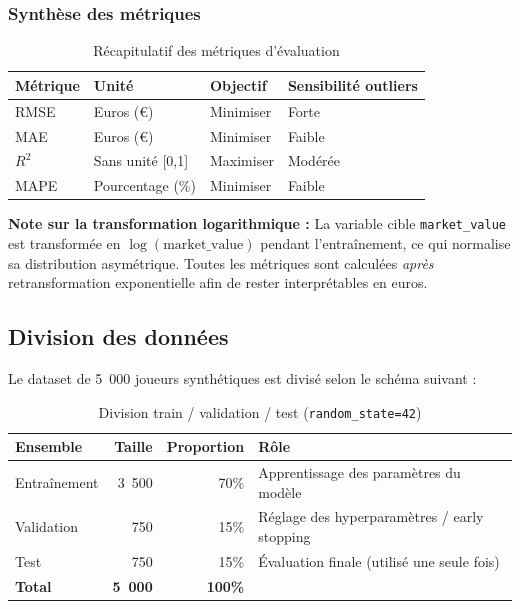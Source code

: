 \documentclass[12pt,a4paper]{article}
\begin{document}
\subsubsection{Synthèse des métriques}

\begin{table}[H]
\centering
\begin{tabular}{@{}llll@{}}
\toprule
\textbf{Métrique} & \textbf{Unité} & \textbf{Objectif} & \textbf{Sensibilité outliers} \\ \midrule
RMSE  & Euros (€)          & Minimiser & Forte   \\
MAE   & Euros (€)          & Minimiser & Faible  \\
$R^2$ & Sans unité [0,1]   & Maximiser & Modérée \\
MAPE  & Pourcentage (\%)   & Minimiser & Faible  \\ \bottomrule
\end{tabular}
\caption{Récapitulatif des métriques d'évaluation}
\end{table}

\textbf{Note sur la transformation logarithmique :} La variable cible
\texttt{market\_value} est transformée en $\log(\text{market\_value})$ pendant
l'entraînement, ce qui normalise sa distribution asymétrique. Toutes les métriques
sont calculées \textit{après} retransformation exponentielle afin de rester
interprétables en euros.



\subsection{Division des données}

Le dataset de 5~000 joueurs synthétiques est divisé selon le schéma suivant :

\begin{table}[H]
\centering
\begin{tabular}{@{}lrrl@{}}
\toprule
\textbf{Ensemble} & \textbf{Taille} & \textbf{Proportion} & \textbf{Rôle} \\ \midrule
Entraînement & 3~500 & 70\% & Apprentissage des paramètres du modèle \\
Validation   &   750 & 15\% & Réglage des hyperparamètres / early stopping \\
Test         &   750 & 15\% & Évaluation finale (utilisé une seule fois) \\ \midrule
\textbf{Total} & \textbf{5~000} & \textbf{100\%} & \\ \bottomrule
\end{tabular}
\caption{Division train / validation / test (\texttt{random\_state=42})}
\end{table}
\end{document}
